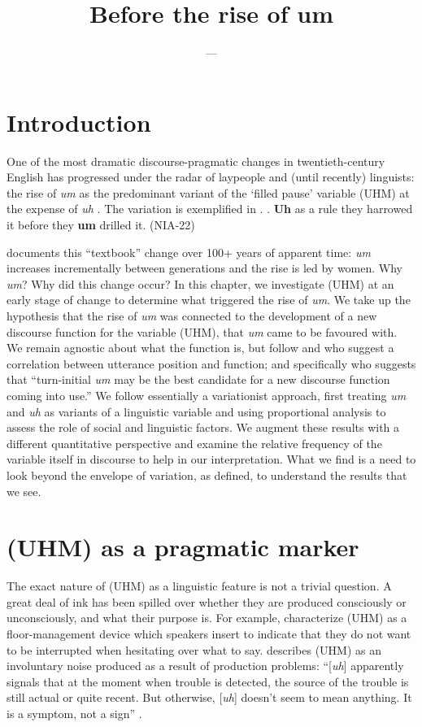 \documentclass[11pt]{article}
\title{Before the rise of um}
\author{---}
\begin{document}
\maketitle

\section{Introduction}

One of the most dramatic discourse-pragmatic changes in twentieth-century
English has progressed under the radar of laypeople and (until recently)
linguists: the rise of \emph{um} as the predominant variant of the `filled
pause' variable (UHM) at the expense of \emph{uh} \parencite{tottie2011,
fruehwald2016, wielingetal2016}.
The variation is exemplified in \Next.
\ex. \textbf{Uh} as a rule they harrowed it before they \textbf{um} drilled it.
\hfill (NIA-22)

\textcite[43]{fruehwald2016} documents this ``textbook'' change over 100+ years
of apparent time:
\emph{um} increases incrementally between generations and the rise is led by
women.
Why \emph{um}? Why did this change occur?
In this chapter, we investigate (UHM) at an early stage of change to determine
what triggered the rise of \emph{um}.
We take up the hypothesis that the rise of \emph{um} was connected to the
development of a new discourse function for the variable (UHM), that \emph{um}
came to be favoured with.
We remain agnostic about what the function is, but follow \textcite{tottie2016}
and \textcite{fruehwald2016} who suggest a correlation between utterance
position and function; and specifically \textcite[46]{fruehwald2016} who suggests
that ``turn-initial \emph{um} may be the best candidate for a new
discourse function coming into use.''
We follow essentially a variationist approach, first treating \emph{um} and
\emph{uh} as variants of a linguistic variable and using proportional analysis
to assess the role of social and linguistic factors.
We augment these results with a different quantitative perspective and examine
the relative frequency of the variable itself in discourse to help in our
interpretation.
What we find is a need to look beyond the envelope of variation, as defined, to
understand the results that we see.

\section{(UHM) as a pragmatic marker}

The exact nature of (UHM) as a linguistic feature is not a trivial question.
A great deal of ink has been spilled over whether they are produced consciously
or unconsciously, and what their purpose is.
For example, \textcite[41--42]{maclayosgood1959} characterize (UHM) as a
floor-management device which speakers insert to indicate that they do not want
to be interrupted when hesitating over what to say.
\textcite{levelt1983, levelt1989} describes (UHM) as an involuntary noise
produced as a result of production problems: ``[\emph{uh}] apparently signals that
at the moment when trouble is detected, the source of the trouble is still
actual or quite recent. But otherwise, [\emph{uh}] doesn't seem to mean anything.
It is a symptom, not a sign'' \parencite[484]{levelt1989}.
\end{document}
